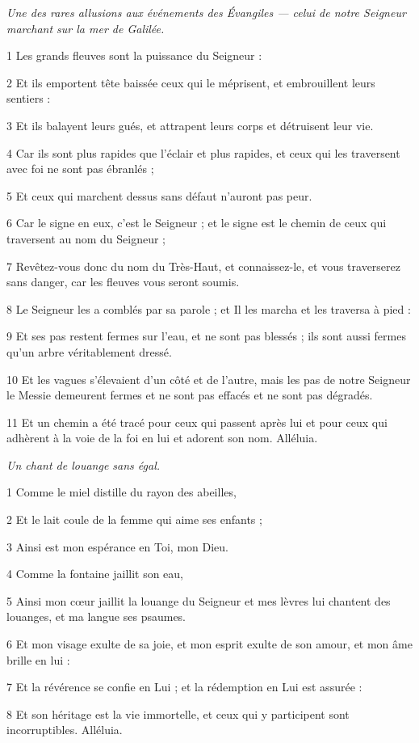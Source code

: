 
\par \textit{Une des rares allusions aux événements des Évangiles — celui de notre Seigneur marchant sur la mer de Galilée.}

\par 1 Les grands fleuves sont la puissance du Seigneur :
\par 2 Et ils emportent tête baissée ceux qui le méprisent, et embrouillent leurs sentiers :
\par 3 Et ils balayent leurs gués, et attrapent leurs corps et détruisent leur vie.
\par 4 Car ils sont plus rapides que l'éclair et plus rapides, et ceux qui les traversent avec foi ne sont pas ébranlés ;
\par 5 Et ceux qui marchent dessus sans défaut n'auront pas peur.
\par 6 Car le signe en eux, c'est le Seigneur ; et le signe est le chemin de ceux qui traversent au nom du Seigneur ;
\par 7 Revêtez-vous donc du nom du Très-Haut, et connaissez-le, et vous traverserez sans danger, car les fleuves vous seront soumis.
\par 8 Le Seigneur les a comblés par sa parole ; et Il les marcha et les traversa à pied :
\par 9 Et ses pas restent fermes sur l'eau, et ne sont pas blessés ; ils sont aussi fermes qu’un arbre véritablement dressé.
\par 10 Et les vagues s'élevaient d'un côté et de l'autre, mais les pas de notre Seigneur le Messie demeurent fermes et ne sont pas effacés et ne sont pas dégradés.
\par 11 Et un chemin a été tracé pour ceux qui passent après lui et pour ceux qui adhèrent à la voie de la foi en lui et adorent son nom. Alléluia.


\par \textit{Un chant de louange sans égal.}

\par 1 Comme le miel distille du rayon des abeilles,
\par 2 Et le lait coule de la femme qui aime ses enfants ;
\par 3 Ainsi est mon espérance en Toi, mon Dieu.
\par 4 Comme la fontaine jaillit son eau,
\par 5 Ainsi mon cœur jaillit la louange du Seigneur et mes lèvres lui chantent des louanges, et ma langue ses psaumes.
\par 6 Et mon visage exulte de sa joie, et mon esprit exulte de son amour, et mon âme brille en lui :
\par 7 Et la révérence se confie en Lui ; et la rédemption en Lui est assurée :
\par 8 Et son héritage est la vie immortelle, et ceux qui y participent sont incorruptibles. Alléluia.

